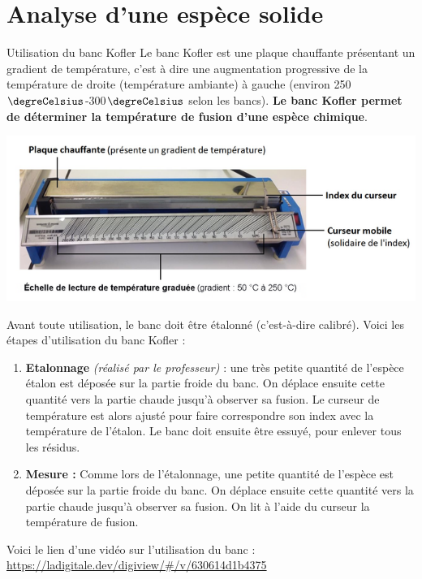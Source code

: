 \section{Analyse d'une espèce solide}

\begin{doc}{Utilisation du banc Kofler}
Le banc Kofler est une plaque chauffante présentant un gradient de température, c’est à dire une augmentation progressive de la température de droite (température ambiante) à gauche (environ 250$\degreCelsius$-300$\degreCelsius$ selon les bancs). \textbf{Le banc Kofler permet de déterminer la température de fusion d’une espèce chimique}.
\begin{center}
    \includegraphics[scale=0.65]{Images/Chapitre_1/Banc_Kofler.png} 
\end{center}

Avant toute utilisation, le banc doit être étalonné (c’est-à-dire calibré). Voici les étapes d'utilisation du banc Kofler :
\begin{enumerate}
    \item \textbf{Etalonnage} \textit{(réalisé par le professeur)} : une très petite quantité de l’espèce étalon est déposée sur la partie froide du banc. On déplace ensuite cette quantité vers la partie chaude jusqu’à observer sa fusion. Le curseur de température est alors ajusté pour faire correspondre son index avec la température de l’étalon. Le banc doit ensuite être essuyé, pour enlever tous les résidus.
    \item \textbf{Mesure :} Comme lors de l’étalonnage, une petite quantité de l’espèce est déposée sur la partie froide du banc. On déplace ensuite cette quantité vers la partie chaude jusqu’à observer sa fusion. On lit à l’aide du curseur la température de fusion.
\end{enumerate}
Voici le lien d'une vidéo sur l'utilisation du banc : \url{https://ladigitale.dev/digiview/#/v/630614d1b4375}\\
\end{doc}

